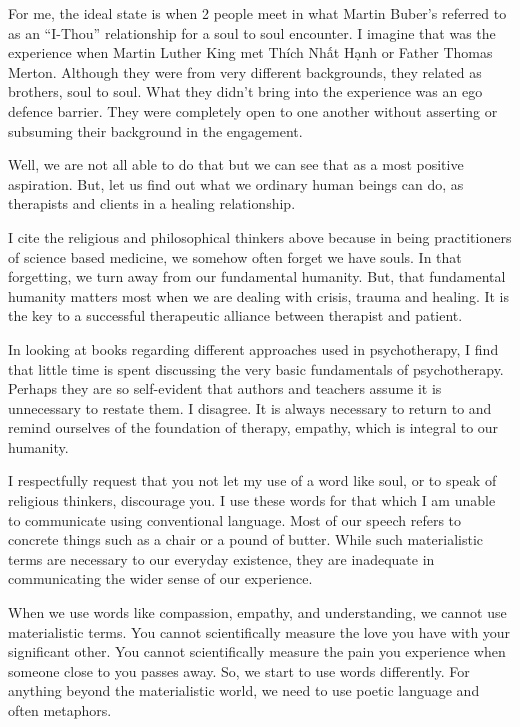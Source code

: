 \documentclass[]{book}
\begin{document}
For me, the ideal state is when 2 people meet in what Martin Buber's referred to as an ``I-Thou'' relationship for a soul to soul encounter. I imagine that was the experience when Martin Luther King met Thích Nhất Hạnh or Father Thomas Merton. Although they were from very different backgrounds, they related as brothers, soul to soul. What they didn't bring into the experience was an ego defence barrier. They were completely open to one another without asserting or subsuming their background in the engagement.

Well, we are not all able to do that but we can see that as a most positive aspiration. But, let us find out what we ordinary human beings can do, as therapists and clients in a healing relationship.

I cite the religious and philosophical thinkers above because in being practitioners of science based medicine, we somehow often forget we have souls. In that forgetting, we turn away from our fundamental humanity. But, that fundamental humanity matters most when we are dealing with crisis, trauma and healing. It is the key to a successful therapeutic alliance between therapist and patient.

In looking at books regarding different approaches used in psychotherapy, I find that little time is spent discussing the very basic fundamentals of psychotherapy. Perhaps they are so self-evident that authors and teachers assume it is unnecessary to restate them. I disagree. It is always necessary to return to and remind ourselves of the foundation of therapy, empathy, which is integral to our humanity.

I respectfully request that you not let my use of a word like soul, or to speak of religious thinkers, discourage you. I use these words for that which I am unable to communicate using conventional language. Most of our speech refers to concrete things such as a chair or a pound of butter. While such materialistic terms are necessary to our everyday existence, they are inadequate in communicating the wider sense of our experience.

When we use words like compassion, empathy, and understanding, we cannot use materialistic terms. You cannot scientifically measure the love you have with your significant other. You cannot scientifically measure the pain you experience when someone close to you passes away. So, we start to use words differently. For anything beyond the materialistic world, we need to use poetic language and often metaphors.
\end{document}
